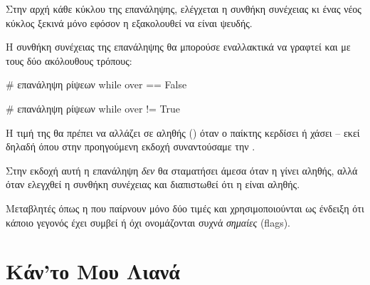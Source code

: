 \documentclass[a4paper,11pt,oneside]{book}
\begin{document}

\clearpage
Στην αρχή κάθε κύκλου της επανάληψης, ελέγχεται η συνθήκη συνέχειας  κι ένας νέος κύκλος ξεκινά μόνο εφόσον η  εξακολουθεί να είναι ψευδής.


Η συνθήκη συνέχειας της επανάληψης θα μπορούσε εναλλακτικά να γραφτεί και με τους δύο ακόλουθους τρόπους:

\begin{pycode}
    # επανάληψη ρίψεων
    while over == False
\end{pycode}

%
\begin{pycode}
    # επανάληψη ρίψεων
    while over != True
\end{pycode}

Η τιμή της  θα πρέπει να αλλάζει σε αληθής () όταν ο παίκτης κερδίσει ή χάσει -- εκεί δηλαδή όπου στην προηγούμενη εκδοχή συναντούσαμε την . 


Στην εκδοχή αυτή η επανάληψη \emph{δεν} θα σταματήσει άμεσα όταν η  γίνει αληθής, αλλά όταν ελεγχθεί η συνθήκη συνέχειας και διαπιστωθεί ότι η  είναι αληθής.

Μεταβλητές όπως η  που παίρνουν μόνο δύο τιμές και χρησιμοποιούνται ως ένδειξη ότι κάποιο γεγονός έχει συμβεί ή όχι ονομάζονται συχνά \emph{σημαίες} (flags).


\section{Κάν'το Μου Λιανά}
\end{document}
